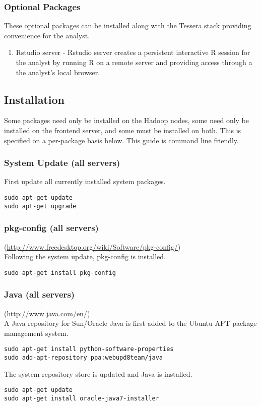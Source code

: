 \subsubsection{Optional Packages}
These optional packages can be installed along with the Tessera stack providing convenience for the analyst. 
\begin{enumerate}
\item Rstudio server - Rstudio server creates a persistent interactive R session for the analyst by running R on a remote server and providing access through a the analyst's local browser.
\end{enumerate}

\newpage

\subsection{Installation}
Some packages need only be installed on the Hadoop nodes, some need only
be installed on the frontend server, and some must be installed on both.
This is specified on a per-package basis below. This guide is command
line friendly.


\subsubsection{System Update (all servers)}
First update all currently installed system packages.

\begin{verbatim}
sudo apt-get update
sudo apt-get upgrade
\end{verbatim}

\subsubsection{pkg-config (all servers)} (\url{http://www.freedesktop.org/wiki/Software/pkg-config/})\\
Following the system update, pkg-config is installed.
\begin{verbatim}
sudo apt-get install pkg-config
\end{verbatim}

\subsubsection{Java (all servers)} (\url{http://www.java.com/en/})\\
A Java repository for Sun/Oracle Java is first added to the Ubuntu APT package management system.
\begin{verbatim}
sudo apt-get install python-software-properties
sudo add-apt-repository ppa:webupd8team/java
\end{verbatim}
The system repository store is updated and Java is installed.
\begin{verbatim}
sudo apt-get update
sudo apt-get install oracle-java7-installer
\end{verbatim}

